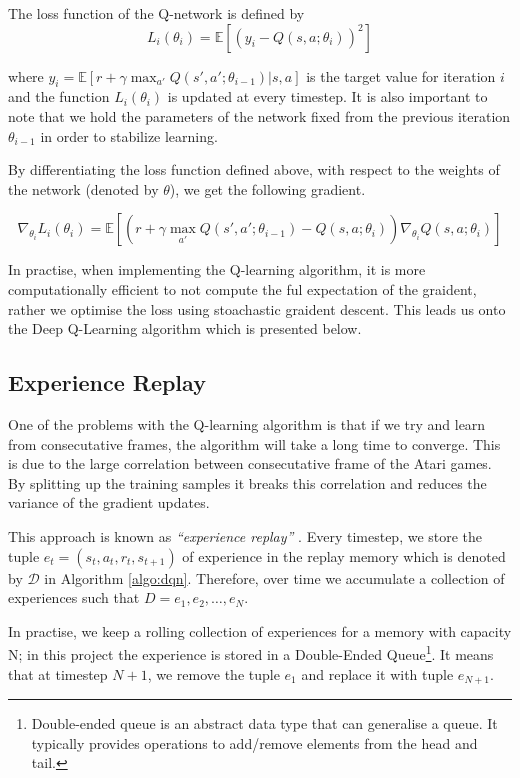 \begin{defn}
	The loss function of the Q-network is defined by
	\[
		L_i(\theta_i) = \mathbb{E}\left[(y_i - Q(s, a; \theta_i))^2\right]
	\]
\end{defn}
where $y_i = \mathbb{E}\left[r + \gamma \max_{a'}Q(s', a'; \theta_{i - 1})\vert s, a\right]$ is the target value for iteration $i$ and the function $L_i(\theta_i)$ is updated at every timestep. It is also important to note that we hold the parameters of the network fixed from the previous iteration $\theta_{i - 1}$ in order to stabilize learning.

By differentiating the loss function defined above, with respect to the weights of the network (denoted by $\theta$), we get the following gradient.

\begin{defn}
	\[
		\nabla_{\theta_i} L_i(\theta_i) = \mathbb{E} \left[ \left( r + \gamma \max_{a'} Q(s', a'; \theta_{i - 1}) - Q(s, a; \theta_i)\right) \nabla_{\theta_i} Q(s, a; \theta_i) \right]
	\]
\end{defn}

In practise, when implementing the Q-learning algorithm, it is more computationally efficient to not compute the ful expectation of the graident, rather we optimise the loss using stoachastic graident descent. This leads us onto the Deep Q-Learning algorithm which is presented below.



\subsection{Experience Replay}
\label{dsgn:subsec:exp-replay}

One of the problems with the Q-learning algorithm is that if we try and learn from consecutative frames, the algorithm will take a long time to converge. This is due to the large correlation between consecutative frame of the Atari games. By splitting up the training samples it breaks this correlation and reduces the variance of the gradient updates.

This approach is known as \textit{``experience replay''} \cite{Lin1992ReinforcementLF}. Every timestep, we store the tuple $e_t = (s_t, a_t, r_t, s_{t+1})$ of experience in the replay memory which is denoted by $\mathcal{D}$ in Algorithm \ref{algo:dqn}. Therefore, over time we accumulate a collection of experiences such that $D = e_1, e_2, \hdots, e_N$.

In practise, we keep a rolling collection of experiences for a memory with capacity N; in this project the experience is stored in a Double-Ended Queue\footnote{Double-ended queue is an abstract data type that can generalise a queue. It typically provides operations to add/remove elements from the head and tail.}. It means that at timestep $N+1$, we remove the tuple $e_1$ and replace it with tuple $e_{N+1}$.

